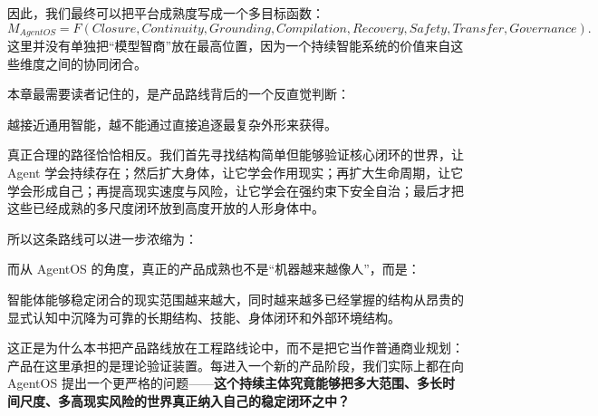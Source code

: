 因此，我们最终可以把平台成熟度写成一个多目标函数：
\[
\boxed{
M_{AgentOS}
=
F(
Closure,
Continuity,
Grounding,
Compilation,
Recovery,
Safety,
Transfer,
Governance
).
}
\]
这里并没有单独把“模型智商”放在最高位置，因为一个持续智能系统的价值来自这些维度之间的协同闭合。

本章最需要读者记住的，是产品路线背后的一个反直觉判断：

\begin{proposition*}
越接近通用智能，越不能通过直接追逐最复杂外形来获得。
\end{proposition*}

真正合理的路径恰恰相反。我们首先寻找结构简单但能够验证核心闭环的世界，让 Agent 学会持续存在；然后扩大身体，让它学会作用现实；再扩大生命周期，让它学会形成自己；再提高现实速度与风险，让它学会在强约束下安全自治；最后才把这些已经成熟的多尺度闭环放到高度开放的人形身体中。

所以这条路线可以进一步浓缩为：
\begin{statementbox}
\centering
{}
\end{statementbox}

而从 AgentOS 的角度，真正的产品成熟也不是“机器越来越像人”，而是：

\begin{statementbox}
智能体能够稳定闭合的现实范围越来越大，同时越来越多已经掌握的结构从昂贵的显式认知中沉降为可靠的长期结构、技能、身体闭环和外部环境结构。
\end{statementbox}

这正是为什么本书把产品路线放在工程路线论中，而不是把它当作普通商业规划：产品在这里承担的是理论验证装置。每进入一个新的产品阶段，我们实际上都在向 AgentOS 提出一个更严格的问题——\textbf{这个持续主体究竟能够把多大范围、多长时间尺度、多高现实风险的世界真正纳入自己的稳定闭环之中？}
